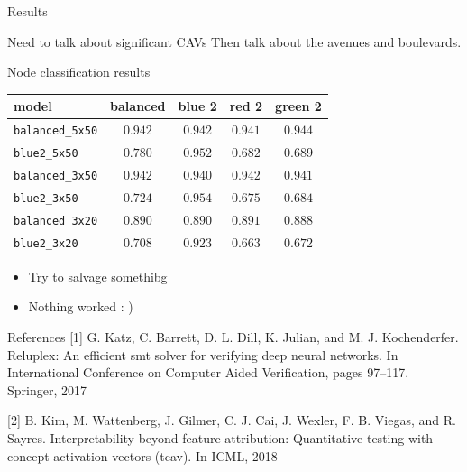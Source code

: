 \documentclass[final]{beamer}
\begin{document}
\begin{frame}[fragile]{}
\begin{textblock}{\colwidth}
\begin{paddedBlock}{Results}

\alert{Need to talk about significant CAVs}
Then talk about the avenues and boulevards.



\alert{Node classification results}

\begin{table}
\centering
\begin{tabular}{lcccc}
\hline

\textbf{model} &  \textbf{balanced} &   \textbf{blue 2} &    \textbf{red 2} &  \textbf{green 2} \\ \hline 
\texttt{balanced\_5x50} &    $0.942$ &  $0.942$ &  $0.941$ &  $0.944$ \\
\texttt{blue2\_5x50} &    $0.780$ &  $0.952$ &  $0.682$ &  $0.689$ \\
\texttt{balanced\_3x50} &    $0.942$ &  $0.940$ &  $0.942$ &  $0.941$ \\
\texttt{blue2\_3x50} &    $0.724$ &  $0.954$ &  $0.675$ &  $0.684$ \\
\texttt{balanced\_3x20} &    $0.890$ &  $0.890$ &  $0.891$ &  $0.888$ \\
\texttt{blue2\_3x20} &    $0.708$ &  $0.923$ &  $0.663$ &  $0.672$ \\
\hline

\end{tabular}
\end{table}



\begin{itemize}
  \item Try to salvage somethibg
  \item Nothing worked : )
\end{itemize}

\end{paddedBlock}


\begin{paddedBlock}{References}
\footnotesize{[1] G. Katz, C. Barrett, D. L. Dill, K. Julian, and M. J. Kochenderfer. Reluplex: An efficient smt solver for verifying deep neural networks. In International Conference on Computer Aided Verification, pages 97–117. Springer, 2017}

\footnotesize{[2] B. Kim, M. Wattenberg, J. Gilmer, C. J. Cai, J. Wexler, F. B. Viegas, and R. Sayres. Interpretability beyond feature attribution: Quantitative testing with concept activation vectors (tcav). In ICML, 2018}


\end{paddedBlock}
\end{textblock}
\end{frame}
\end{document}
